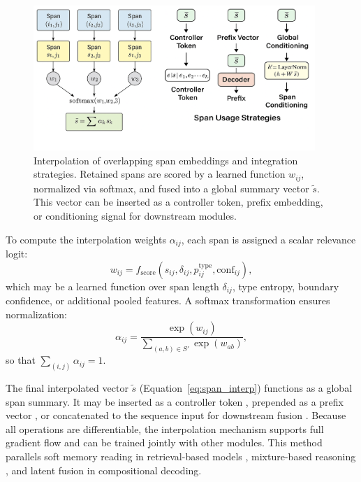\begin{figure}[t]
  \centering
  \includegraphics[width=0.95\textwidth]{figures/figure_1.png}
  \caption{Interpolation of overlapping span embeddings and integration strategies. Retained spans are scored by a learned function \( w_{ij} \), normalized via softmax, and fused into a global summary vector \( \tilde{s} \). This vector can be inserted as a controller token, prefix embedding, or conditioning signal for downstream modules.}
  \label{fig:span_interpolation}
\end{figure}

To compute the interpolation weights \( \alpha_{ij} \), each span is assigned a scalar relevance logit:
\begin{equation}
  w_{ij} = f_\mathrm{score}(s_{ij}, \delta_{ij}, p^\mathrm{type}_{ij}, \mathrm{conf}_{ij}), \label{eq:relevance_score}
\end{equation}
which may be a learned function over span length \( \delta_{ij} \), type entropy, boundary confidence, or additional pooled features. A softmax transformation ensures normalization:
\begin{equation}
  \alpha_{ij} = \frac{\exp(w_{ij})}{\sum_{(a,b)\in S'} \exp(w_{ab})}, \label{eq:softmax_weights}
\end{equation}
so that \( \sum_{(i,j)} \alpha_{ij} = 1 \).

The final interpolated vector \( \tilde{s} \) (Equation~\ref{eq:span_interp}) functions as a global span summary. It may be inserted as a controller token \cite{devlin2019bert}, prepended as a prefix vector \cite{li2021prefix}, or concatenated to the sequence input for downstream fusion \cite{zhang2022opt}. Because all operations are differentiable, the interpolation mechanism supports full gradient flow and can be trained jointly with other modules. This method parallels soft memory reading in retrieval-based models \cite{guu2020retrieval, izacard2020distilling}, mixture-based reasoning \cite{arora2022exsum}, and latent fusion in compositional decoding.

